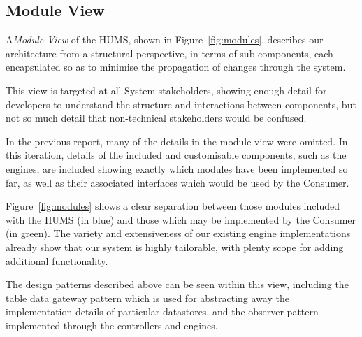 \documentclass[10pt,a4paper]{article}
\begin{document}
\subsection{Module View}
\label{sec:views}
A\emph{Module View} of the HUMS, shown in Figure~\ref{fig:modules}, describes our architecture from a structural perspective, in terms of sub-components, each encapsulated so as to minimise the propagation of changes through the system. %

This view is targeted at all System stakeholders, showing enough detail for developers to understand the structure and interactions between components, but not so much detail that non-technical stakeholders would be confused.

In the previous report, many of the details in the module view were omitted. In this iteration, details of the included and customisable components, such as the engines, are included showing exactly which modules have been implemented so far, as well as their associated interfaces which would be used by the Consumer. 

Figure~\ref{fig:modules} shows a clear separation between those modules included with the HUMS (in blue) and those which may be implemented by the Consumer (in green). The variety and extensiveness of our existing engine implementations already show that our system is highly tailorable, with plenty scope for adding additional functionality.

The design patterns described above can be seen within this view, including the table data gateway pattern which is used for abstracting away the implementation details of particular datastores, and the observer pattern implemented through the controllers and engines.
\end{document}
